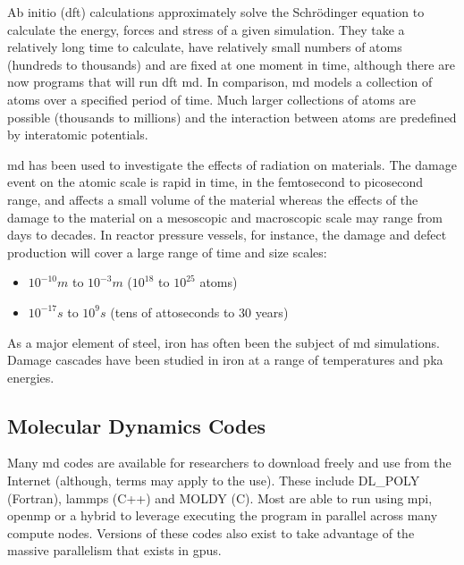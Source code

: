 Ab initio (\acrshort{dft}) calculations approximately solve the Schr\"{o}dinger equation to calculate the energy, forces and stress of a given simulation.  They take a relatively long time to calculate, have relatively small numbers of atoms (hundreds to thousands) and are fixed at one moment in time, although there are now programs that will run \acrshort{dft} \acrshort{md}.  In comparison, \acrshort{md} models a collection of atoms over a specified period of time.  Much larger collections of atoms are possible (thousands to millions) and the interaction between atoms are predefined by interatomic potentials.

\Acrlong{md} has been used to investigate the effects of radiation on materials.  The damage event on the atomic scale is rapid in time, in the femtosecond to picosecond range, and affects a small volume of the material whereas the effects of the damage to the material on a mesoscopic and macroscopic scale may range from days to decades.  In reactor pressure vessels, for instance, the damage and defect production will cover a large range of time and size scales\cite{damagebcciron}:

\begin{itemize}
\item $10^{-10}m$ to $10^{-3}m$ ($10^{18}$ to $10^{25}$ atoms)
\item $10^{-17}s$ to $10^{9}s$ (tens of attoseconds to 30 years)
\end{itemize}

As a major element of steel, iron has often been the subject of \acrshort{md} simulations.  Damage cascades have been studied in iron at a range of temperatures and \acrshort{pka} energies.



\subsection{Molecular Dynamics Codes}

Many \acrshort{md} codes are available for researchers to download freely and use from the Internet (although, terms may apply to the use).  These include DL\_POLY (Fortran), \acrfull{lammps} (C++) and MOLDY (C).  Most are able to run using \acrfull{mpi}, \acrfull{openmp} or a hybrid to leverage executing the program in parallel across many compute nodes.  Versions of these codes also exist to take advantage of the massive parallelism that exists in \acrlong{gpu}s.

